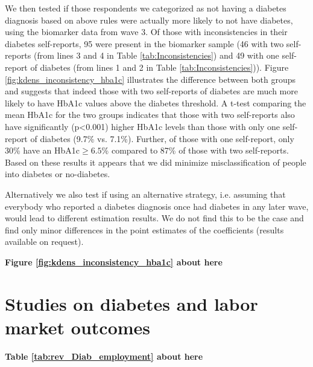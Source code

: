 \documentclass[12pt,english]{article}
\begin{document}
\begin{appendix}
We then tested if those respondents we categorized as not having a diabetes diagnosis based on above rules were actually more likely to not have diabetes, using the biomarker data from wave 3. Of those with inconsistencies in their diabetes self-reports, 95 were present in the biomarker sample (46 with two self-reports (from lines 3 and 4 in Table \ref{tab:Inconsistencies}) and 49 with one self-report of diabetes (from lines 1 and 2 in Table \ref{tab:Inconsistencies})). Figure \ref{fig:kdens_inconsistency_hba1c} illustrates the difference between both groups and suggests that indeed those with two self-reports of diabetes are much more likely to have \ac{HbA1c} values above the diabetes threshold. A t-test comparing the mean \ac{HbA1c} for the two groups indicates that those with two self-reports also have significantly (p<0.001) higher \ac{HbA1c} levels than those with only one self-report of diabetes (9.7\% vs. 7.1\%). Further, of those with one self-report,  only 30\% have an \ac{HbA1c}$\geq6.5$\% compared to 87\% of those with two self-reports. Based on these results it appears that we did minimize misclassification of people into diabetes or no-diabetes. 

Alternatively we also test if using an alternative strategy, i.e. assuming that everybody who reported  a diabetes diagnosis once had diabetes in any later wave, would lead to different estimation results. We do not find this to be the case and find only minor differences in the point estimates of the coefficients (results available on request). 

\begin{center}
	\textbf{Figure \ref{fig:kdens_inconsistency_hba1c} about here}
\end{center}


\section{\label{sec:Appendix_B}Studies on diabetes and labor market outcomes}
\begin{center}
	\textbf{Table \ref{tab:rev_Diab_employment} about here}
\end{center}



\end{appendix}




\printbibliography
\end{document}
